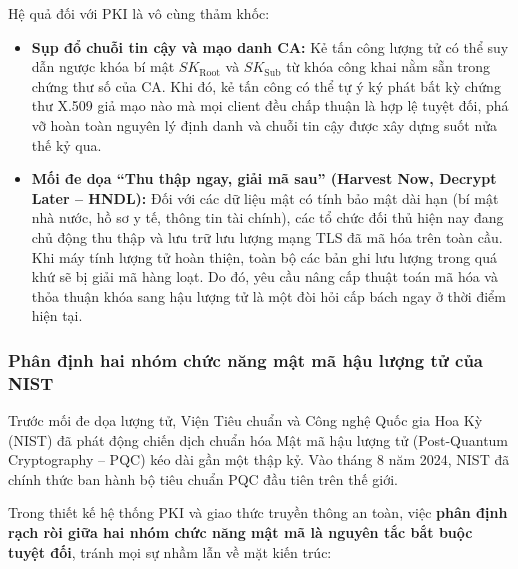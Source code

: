 Hệ quả đối với PKI là vô cùng thảm khốc:
\begin{itemize}
    \item \textbf{Sụp đổ chuỗi tin cậy và mạo danh CA:} Kẻ tấn công lượng tử có thể suy dẫn ngược khóa bí mật $SK_{\mathrm{Root}}$ và $SK_{\mathrm{Sub}}$ từ khóa công khai nằm sẵn trong chứng thư số của CA. Khi đó, kẻ tấn công có thể tự ý ký phát bất kỳ chứng thư X.509 giả mạo nào mà mọi client đều chấp thuận là hợp lệ tuyệt đối, phá vỡ hoàn toàn nguyên lý định danh và chuỗi tin cậy được xây dựng suốt nửa thế kỷ qua.
    \item \textbf{Mối đe dọa ``Thu thập ngay, giải mã sau'' (Harvest Now, Decrypt Later -- HNDL):} Đối với các dữ liệu mật có tính bảo mật dài hạn (bí mật nhà nước, hồ sơ y tế, thông tin tài chính), các tổ chức đối thủ hiện nay đang chủ động thu thập và lưu trữ lưu lượng mạng TLS đã mã hóa trên toàn cầu. Khi máy tính lượng tử hoàn thiện, toàn bộ các bản ghi lưu lượng trong quá khứ sẽ bị giải mã hàng loạt. Do đó, yêu cầu nâng cấp thuật toán mã hóa và thỏa thuận khóa sang hậu lượng tử là một đòi hỏi cấp bách ngay ở thời điểm hiện tại.
\end{itemize}

\subsubsection{Phân định hai nhóm chức năng mật mã hậu lượng tử của NIST}
Trước mối đe dọa lượng tử, Viện Tiêu chuẩn và Công nghệ Quốc gia Hoa Kỳ (NIST) đã phát động chiến dịch chuẩn hóa Mật mã hậu lượng tử (Post-Quantum Cryptography -- PQC) kéo dài gần một thập kỷ. Vào tháng 8 năm 2024, NIST đã chính thức ban hành bộ tiêu chuẩn PQC đầu tiên trên thế giới.

Trong thiết kế hệ thống PKI và giao thức truyền thông an toàn, việc \textbf{phân định rạch ròi giữa hai nhóm chức năng mật mã là nguyên tắc bắt buộc tuyệt đối}, tránh mọi sự nhầm lẫn về mặt kiến trúc:

